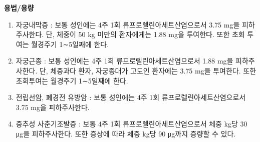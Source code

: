 \textbf{용법/용량}
\begin{enumerate}[1.]\tightlist
\item 자궁내막증 : 보통 성인에는 4주 1회 류프로렐린아세트산염으로서 3.75 mg을 피하주사한다. 단, 체중이 50 kg 미만의 환자에게는 1.88 mg을 투여한다. 또한 초회 투여는 월경주기 1∼5일째에 한다. 
\item 자궁근종 : 보통 성인에는 4주 1회 류프로렐린아세트산염으로서 1.88 mg을 피하주사한다. 단, 체중과다 환자, 자궁종대가 고도인 환자에는 3.75 mg을 투여한다. 또한 초회투여는 월경주기 1∼5일째에 한다. 
\item 전립선암, 폐경전 유방암 : 보통 성인에는 4주 1회 류프로렐린아세트산염으로서 3.75 mg을 피하주사한다. 
\item 중추성 사춘기조발증 : 보통 4주 1회 류프로렐린아세트산염으로서 체중 kg당 30 μg을 피하주사한다. 또한 증상에 따라 체중 kg당 90 μg까지 증량할 수 있다.
\end{enumerate}


